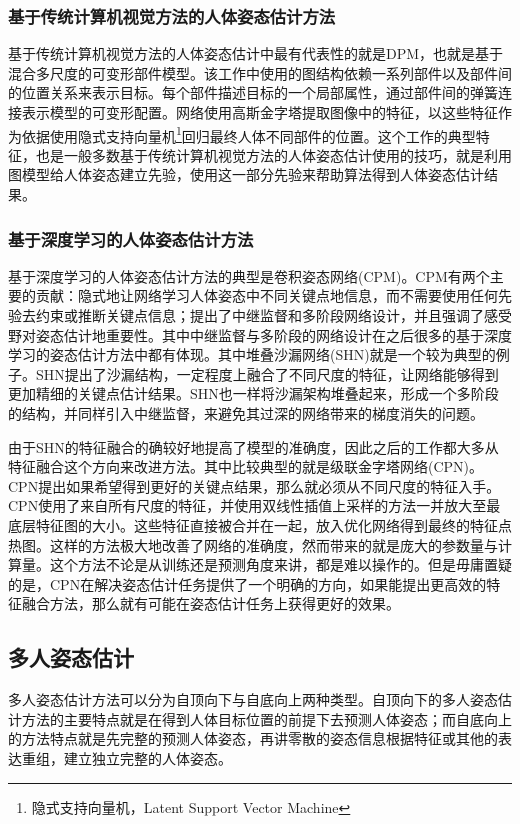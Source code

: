 \subsubsection{基于传统计算机视觉方法的人体姿态估计方法}
\label{subsubsec:legacypose}
基于传统计算机视觉方法的人体姿态估计中最有代表性的就是DPM\cite{felzenszwalb2010object}，也就是基于混合多尺度的可变形部件模型。该工作中使用的图结构依赖一系列部件以及部件间的位置关系来表示目标。每个部件描述目标的一个局部属性，通过部件间的弹簧连接表示模型的可变形配置。网络使用高斯金字塔提取图像中的特征，以这些特征作为依据使用隐式支持向量机\footnote{隐式支持向量机，Latent Support Vector Machine}回归最终人体不同部件的位置。这个工作的典型特征，也是一般多数基于传统计算机视觉方法的人体姿态估计使用的技巧，就是利用图模型给人体姿态建立先验，使用这一部分先验来帮助算法得到人体姿态估计结果。
\subsubsection{基于深度学习的人体姿态估计方法}
\label{subsubsec:deeppose}
基于深度学习的人体姿态估计方法的典型是卷积姿态网络(CPM)\cite{wei2016convolutional}。CPM有两个主要的贡献：隐式地让网络学习人体姿态中不同关键点地信息，而不需要使用任何先验去约束或推断关键点信息；提出了中继监督和多阶段网络设计，并且强调了感受野对姿态估计地重要性。其中中继监督与多阶段的网络设计在之后很多的基于深度学习的姿态估计方法中都有体现。其中堆叠沙漏网络(SHN)\cite{newell2016stacked}就是一个较为典型的例子。SHN提出了沙漏结构，一定程度上融合了不同尺度的特征，让网络能够得到更加精细的关键点估计结果。SHN也一样将沙漏架构堆叠起来，形成一个多阶段的结构，并同样引入中继监督，来避免其过深的网络带来的梯度消失的问题。

由于SHN的特征融合的确较好地提高了模型的准确度，因此之后的工作都大多从特征融合这个方向来改进方法。其中比较典型的就是级联金字塔网络(CPN)\cite{Chen2017Cascaded}。CPN提出如果希望得到更好的关键点结果，那么就必须从不同尺度的特征入手。CPN使用了来自所有尺度的特征，并使用双线性插值上采样的方法一并放大至最底层特征图的大小。这些特征直接被合并在一起，放入优化网络得到最终的特征点热图。这样的方法极大地改善了网络的准确度，然而带来的就是庞大的参数量与计算量。这个方法不论是从训练还是预测角度来讲，都是难以操作的。但是毋庸置疑的是，CPN在解决姿态估计任务提供了一个明确的方向，如果能提出更高效的特征融合方法，那么就有可能在姿态估计任务上获得更好的效果。

\subsection{多人姿态估计}
\label{subsubsec:multipose}
多人姿态估计方法可以分为自顶向下与自底向上两种类型。自顶向下的多人姿态估计方法的主要特点就是在得到人体目标位置的前提下去预测人体姿态；而自底向上的方法特点就是先完整的预测人体姿态，再讲零散的姿态信息根据特征或其他的表达重组，建立独立完整的人体姿态。
